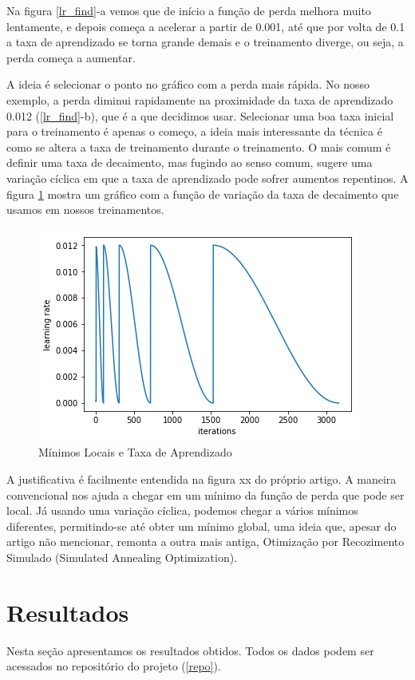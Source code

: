 \documentclass[conference]{IEEEtran}
\begin{document}
Na figura \ref{lr_find}-a vemos que de início a função de perda melhora muito lentamente, e depois começa a acelerar a partir de 0.001, até que por volta de 0.1 a taxa de aprendizado se torna grande demais e o treinamento diverge, ou seja, a perda começa a aumentar. 

A ideia é selecionar o ponto no gráfico com a perda mais rápida. No nosso exemplo, a perda diminui rapidamente na proximidade da taxa de aprendizado 0.012 (\ref{lr_find}-b), que é a que decidimos usar. Selecionar uma boa taxa inicial para o treinamento é apenas o começo, a ideia mais interessante da técnica é como se altera a taxa de treinamento durante o treinamento.  O mais comum é definir uma taxa de decaimento, mas fugindo ao senso comum,\cite{cyclical} sugere uma variação cíclica em que a taxa de aprendizado pode sofrer aumentos repentinos. A figura \ref{cicle} mostra um gráfico com a função de variação da taxa de decaimento que usamos em nossos treinamentos.


\begin{figure}[ht!]
\label{cicle}
\begin{center}
\includegraphics[width=.75\columnwidth]{cyclical_graph.png}
\caption{Mínimos Locais e Taxa de Aprendizado}
\end{center}
\end{figure}

A justificativa é facilmente entendida na figura xx do próprio artigo.  A maneira convencional nos ajuda a chegar em um mínimo da função de perda que pode ser local. Já usando uma variação cíclica, podemos chegar a vários mínimos diferentes, permitindo-se até obter um mínimo global, uma ideia que, apesar do artigo não mencionar, remonta a outra mais antiga, Otimização por Recozimento Simulado (Simulated Annealing Optimization)\cite{annealing}.

\section{Resultados}
Nesta seção apresentamos os resultados obtidos. Todos os dados podem ser acessados no repositório do projeto (\ref{repo}).
\end{document}
